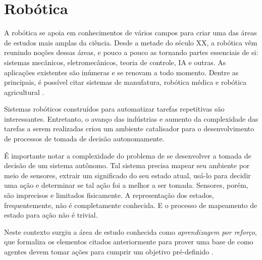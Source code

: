 \section{Robótica}
\par A robótica se apoia em conhecimentos de vários campos para criar uma das áreas de estudos mais amplas da ciência. Desde a metade do século XX, a robótica vêm reunindo noções dessas áreas, e pouco a pouco as tornando partes essenciais de si: sistemas mecânicos, eletromecânicos, teoria de controle, IA e outras. As aplicações existentes são inúmeras e se renovam a todo momento. Dentre as principais, é possível citar sistemas de manufatura, robótica médica e robótica agricultural \cite{handbook2007}. 
\par Sistemas robóticos construídos para automatizar tarefas repetitivas são interessantes. Entretanto, o avanço das indústrias e aumento da complexidade das tarefas a serem realizadas criou um ambiente catalisador para o desenvolvimento de processos de tomada de decisão autonomamente. 
\par É importante notar a complexidade do problema de se desenvolver a tomada de decisão de um sistema autônomo. Tal sistema precisa mapear seu ambiente por meio de sensores, extrair um significado do seu estado atual, usá-lo para decidir uma ação e determinar se tal ação foi a melhor a ser tomada. Sensores, porém, são imprecisos e limitados fisicamente. A representação dos estados, frequentemente, não é completamente conhecida. E o processo de mapeamento de estado para ação não é trivial.
\par Neste contexto surgiu a área de estudo conhecida como \textit{aprendizagem por reforço}, que formaliza os elementos citados anteriormente para prover uma base de como agentes devem tomar ações para cumprir um objetivo pré-definido \cite{sutton2018reinforcement}.


